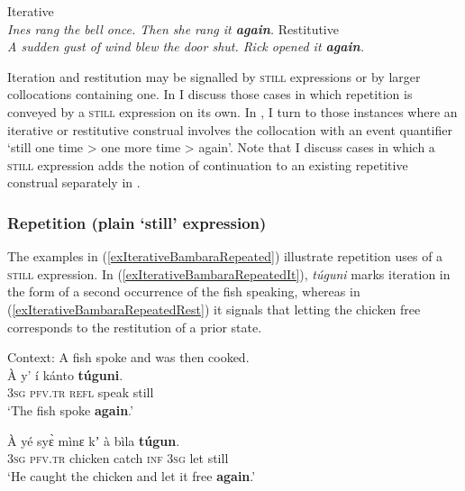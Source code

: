 \begin{exe}
	\ex \label{exIterativeSectionIntro}
	\begin{xlist}
		\exi{}
		\ex Iterative\label{exIterativeSectionIntroIterative}\\
		\textit{Ines rang the bell once. Then she rang it \textbf{again}.}
		\ex Restitutive\label{exIterativeSectionIntroRestitutive}\\
		\textit{A sudden gust of wind blew the door shut. Rick opened it \textbf{again}.}
	\end{xlist}
\end{exe}

Iteration and restitution may be signalled by \textsc{still} expressions or by larger collocations containing one. In  I discuss those cases in which repetition is conveyed by a \textsc{still} expression on its own. In , I turn to those instances where an iterative or restitutive construal involves the collocation with an event quantifier \lq still one time > one more time > again\rq{}. Note that I discuss cases in which a \textsc{still} expression adds the notion of continuation to an existing repetitive construal separately in .

\subsubsection{Repetition (plain  \lq still\rq{ }expression)}
\label{sectionIterative}
The  examples in (\ref{exIterativeBambaraRepeated}) illustrate repetition uses of a \textsc{still} expression. In (\ref{exIterativeBambaraRepeatedIt}), \textit{túguni} marks iteration in the form of a second occurrence of the fish speaking, whereas in (\ref{exIterativeBambaraRepeatedRest}) it signals that letting the chicken free corresponds to the restitution of a prior state.

\begin{exe}
	\ex \label{exIterativeBambaraRepeated}
	\begin{xlist}
		\exi{}\ili{Bambara}
		\ex Context: A fish spoke and was then cooked.\label{exIterativeBambaraRepeatedIt}\\		
		\gll À	y’ í kánto \textbf{túguni}.\\
		3\textsc{sg} \textsc{pfv}.\textsc{tr} \textsc{refl} speak still\\
		\glt \lq The fish spoke \textbf{again}.'

		\ex 
		\gll À yé syɛ̀ mìnɛ kʼ à bìla \textbf{túgun}.\label{exIterativeBambaraRepeatedRest}\il{Bambara}\\
		3\textsc{sg} \textsc{pfv}.\textsc{tr} chicken catch \textsc{inf} 3\textsc{sg} let still\\
		\glt \lq He caught the chicken and let it free \textbf{again}.'
		\\\parencite[118]{DombrowskyHahn2020}
		\end{xlist}
\end{exe}

